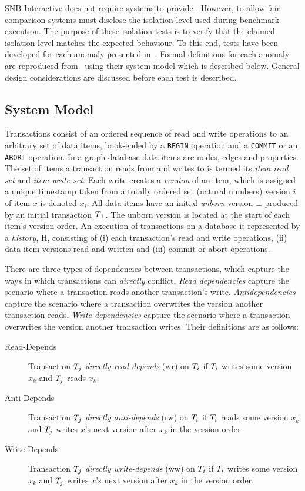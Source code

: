 SNB Interactive does not require systems to provide .
However, to allow fair comparison systems must disclose the isolation level used during benchmark execution.
The purpose of these isolation tests is to verify that the claimed isolation level matches the expected behaviour.
To this end, tests have been developed for each anomaly presented in~\cite{DBLP:journals/tods/BailisFGHS16}.
Formal definitions for each anomaly are reproduced from~\cite{adya1999weak,DBLP:journals/tods/BailisFGHS16} using their system model which is described below.
General design considerations are discussed before each test is described.

\subsection{System Model}
\label{sec:system-model}

Transactions consist of an ordered sequence of read and write operations to an arbitrary set of data items, book-ended by a \texttt{BEGIN} operation and a \texttt{COMMIT} or an \texttt{ABORT} operation.
In a graph database data items are nodes, edges and properties.
The set of items a transaction reads from and writes to is termed its \emph{item read set} and \emph{item write set}.
Each write creates a \emph{version} of an item, which is assigned a unique timestamp taken from a totally ordered set (\eg natural numbers) version $i$ of item $x$ is denoted $x_i$.
All data items have an initial \emph{unborn} version $\bot$ produced by an initial transaction $T_{\bot}$.
The unborn version is located at the start of each item's version order.
An execution of transactions on a database is represented by a \emph{history}, H, consisting of (i) each transaction's read and write operations, (ii) data item versions read and written and (iii) commit or abort operations.

There are three types of dependencies between transactions, which capture the ways in which transactions can \emph{directly} conflict.
\emph{Read dependencies} capture the scenario where a transaction reads another transaction's write.
\emph{Antidependencies} capture the scenario where a transaction overwrites the version another transaction reads.
\emph{Write dependencies} capture the scenario where a transaction overwrites the version another transaction writes. Their definitions are as follows:

\begin{description}
  \item[Read-Depends]
    Transaction $T_j$ \emph{directly read-depends} (\textsf{wr}) on $T_i$ if $T_i$ writes some version $x_k$ and $T_j$ reads $x_k$.
  \item[Anti-Depends]
    Transaction $T_j$ \emph{directly anti-depends} (\textsf{rw}) on $T_i$ if $T_i$ reads some version $x_k$ and $T_j$ writes $x$'s next version after $x_k$ in the version order.
  \item[Write-Depends]
    Transaction $T_j$ \emph{directly write-depends} (\textsf{ww}) on $T_i$ if $T_i$ writes some version $x_k$ and $T_j$ writes $x$'s next version after $x_k$ in the version order.
\end{description}


